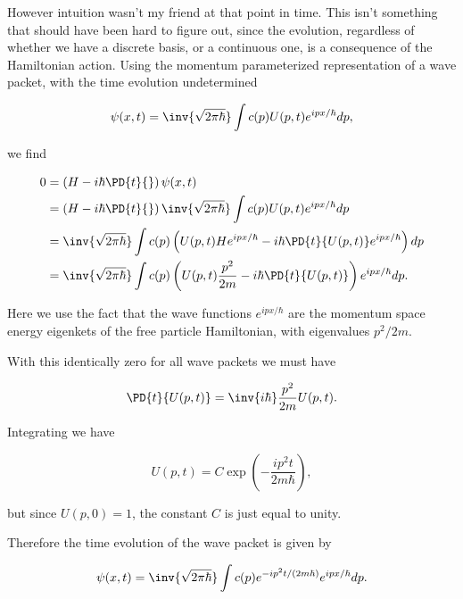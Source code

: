 However intuition wasn't my friend at that point in time.  This isn't something that should have been hard to figure out, since the evolution, regardless of whether we have a discrete basis, or a continuous one, is a consequence of the Hamiltonian action.  Using the momentum parameterized representation of a wave packet, with the time evolution undetermined

\begin{equation}\label{eqn:qmTwoExamReflection:170}
\psi(x, t) = \inv{\sqrt{2 \pi \hbar}} \int c(p) U(p, t) e^{i p x/\hbar} dp,
\end{equation}

we find

\begin{align*}
0 &= 
\left(H - i \hbar \PD{t}{}\right) 
\psi(x, t) \\
&=
\left(H - i \hbar \PD{t}{}\right) 
\inv{\sqrt{2 \pi \hbar}} \int c(p) U(p, t) e^{i p x/\hbar} dp \\
&=
\inv{\sqrt{2 \pi \hbar}} \int c(p) \left( 
U(p, t) H e^{i p x/\hbar} 
-i \hbar \PD{t}{U(p, t)} e^{i p x/\hbar} 
\right) dp  \\
&=
\inv{\sqrt{2 \pi \hbar}} \int c(p) \left( 
U(p, t) \frac{p^2}{2m} 
-i \hbar \PD{t}{U(p, t)} 
\right) 
e^{i p x/\hbar} 
dp.
\end{align*}

Here we use the fact that the wave functions $e^{i p x/\hbar}$ are the momentum space energy eigenkets of the free particle Hamiltonian, with eigenvalues $p^2/2m$.

With this identically zero for all wave packets we must have

\begin{equation}\label{eqn:qmTwoExamReflection:190}
\PD{t}{U(p, t)} 
= 
\inv{i \hbar}
\frac{p^2}{2m} 
U(p, t).
\end{equation}

Integrating we have

\begin{equation}\label{eqn:qmTwoExamReflection:210}
U(p, t) = C \exp\left( -\frac{i p^2 t}{2m \hbar} \right),
\end{equation}

but since $U(p, 0) = 1$, the constant $C$ is just equal to unity.

Therefore the time evolution of the wave packet is given by

\begin{equation}\label{eqn:qmTwoExamReflection:230}
\psi(x, t) = \inv{\sqrt{2 \pi \hbar}} \int c(p) e^{-i p^2 t/(2m \hbar)} e^{i p x/\hbar} dp.
\end{equation}


